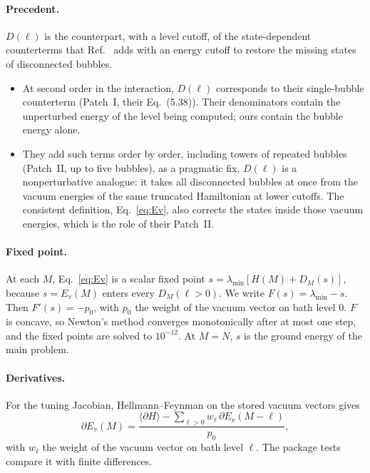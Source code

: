 \paragraph{Precedent.} $D(\ell)$ is the counterpart, with a level cutoff, of the state-dependent counterterms that
Ref.~\cite{Elias-Miro:2020qwz} adds with an energy cutoff to restore the missing states of disconnected bubbles.
\begin{itemize}
\item At second order in the interaction, $D(\ell)$ corresponds to their single-bubble counterterm (Patch~I, their
 Eq.~(5.38)). Their denominators contain the unperturbed energy of the level being computed; ours contain the bubble
 energy alone.
\item They add such terms order by order, including towers of repeated bubbles (Patch~II, up to five bubbles), as a
 pragmatic fix. $D(\ell)$ is a nonperturbative analogue: it takes all disconnected bubbles at once from the vacuum
 energies of the same truncated Hamiltonian at lower cutoffs. The consistent definition, Eq.~\eqref{eq:Ev}, also
 corrects the states inside those vacuum energies, which is the role of their Patch~II.
\end{itemize}

\paragraph{Fixed point.} At each $M$, Eq.~\eqref{eq:Ev} is a scalar fixed point $s=\lambda_{\min}[H(M)+D_M(s)]$,
because $s=E_v(M)$ enters every $D_M(\ell>0)$. We write $F(s)=\lambda_{\min}-s$. Then $F'(s)=-p_0$, with $p_0$ the
weight of the vacuum vector on bath level 0. $F$ is concave, so Newton's method converges monotonically after at most
one step, and the fixed points are solved to $10^{-12}$. At $M=N$, $s$ is the ground energy of the main problem.

\paragraph{Derivatives.} For the tuning Jacobian, Hellmann--Feynman on the stored vacuum vectors gives
\begin{equation}
 \partial E_v(M)=\frac{\langle\partial H\rangle-\sum_{\ell>0}w_\ell\,\partial E_v(M-\ell)}{p_0},
 \label{eq:dEv}
\end{equation}
with $w_\ell$ the weight of the vacuum vector on bath level $\ell$. The package tests compare it with finite differences.

